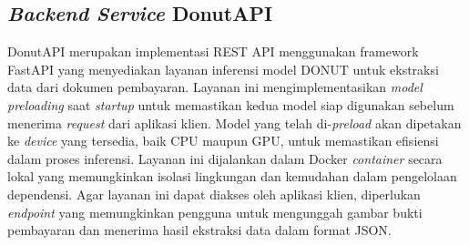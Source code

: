 \subsection{\emph{Backend Service} DonutAPI}
\label{subsec:backend-service-donutapi}

DonutAPI merupakan implementasi REST API menggunakan framework FastAPI yang menyediakan layanan inferensi model DONUT untuk ekstraksi data dari dokumen pembayaran. Layanan ini  mengimplementasikan \emph{model preloading} saat \emph{startup} untuk memastikan kedua model siap digunakan sebelum menerima \emph{request} dari aplikasi klien. Model yang telah di-\emph{preload} akan dipetakan ke \emph{device} yang tersedia, baik CPU maupun GPU, untuk memastikan efisiensi dalam proses inferensi. Layanan ini dijalankan dalam Docker \emph{container} secara lokal yang memungkinkan isolasi lingkungan dan kemudahan dalam pengelolaan dependensi. Agar layanan ini dapat diakses oleh aplikasi klien, diperlukan \emph{endpoint} yang memungkinkan pengguna untuk mengunggah gambar bukti pembayaran dan menerima hasil ekstraksi data dalam format JSON. 





